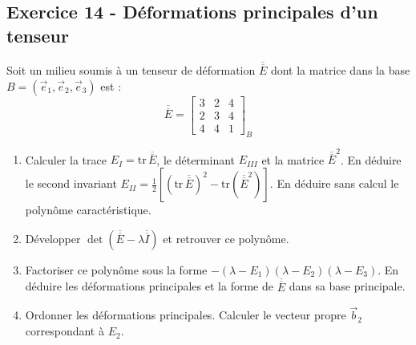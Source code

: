 \documentclass[12pt,a4paper]{article}
\begin{document}
\subsection*{Exercice 14 - Déformations principales d'un tenseur \niveau{\difficile}}

\begin{boiteexercice}
Soit un milieu soumis à un tenseur de déformation $\overline{\overline{E}}$ dont la matrice dans la base $B=(\vec{e}_1,\vec{e}_2,\vec{e}_3)$ est :
\[
\overline{\overline{E}} = \begin{bmatrix}3&2&4\\2&3&4\\4&4&1\end{bmatrix}_B
\]
\begin{enumerate}
  \item Calculer la trace $E_I = \mathrm{tr}\,\overline{\overline{E}}$, le déterminant $E_{III}$ et la matrice $\overline{\overline{E}}^2$. En déduire le second invariant $E_{II} = \frac{1}{2}\left[(\mathrm{tr}\,\overline{\overline{E}})^2 - \mathrm{tr}(\overline{\overline{E}}^2)\right]$. En déduire sans calcul le polynôme caractéristique.
  \item Développer $\det(\overline{\overline{E}}-\lambda\overline{\overline{I}})$ et retrouver ce polynôme.
  \item Factoriser ce polynôme sous la forme $-(\lambda-E_1)(\lambda-E_2)(\lambda-E_3)$. En déduire les déformations principales et la forme de $\overline{\overline{E}}$ dans sa base principale.
  \item Ordonner les déformations principales. Calculer le vecteur propre $\vec{b}_2$ correspondant à $E_2$.
\end{enumerate}
\end{boiteexercice}
\end{document}

